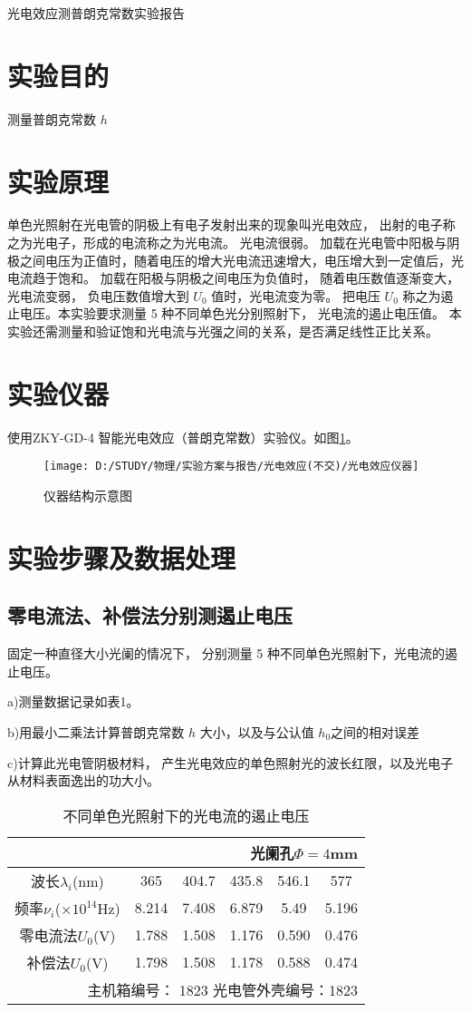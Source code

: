 \documentclass[11pt]{article}
\begin{document}
	\begin{center}
		\Large \heiti 光电效应测普朗克常数实验报告
	\end{center}
\section{实验目的}
测量普朗克常数 $ h $
\section{实验原理}
单色光照射在光电管的阴极上有电子发射出来的现象叫光电效应， 出射的电子称之为光电子，形成的电流称之为光电流。 光电流很弱。 加载在光电管中阳极与阴极之间电压为正值时，随着电压的增大光电流迅速增大，电压增大到一定值后，光电流趋于饱和。 加载在阳极与阴极之间电压为负值时， 随着电压数值逐渐变大，光电流变弱， 负电压数值增大到 $ U_0 $ 值时，光电流变为零。 把电压 $ U_0 $ 称之为遏止电压。本实验要求测量 5 种不同单色光分别照射下， 光电流的遏止电压值。 本实验还需测量和验证饱和光电流与光强之间的关系，是否满足线性正比关系。
\section{实验仪器}
使用ZKY-GD-4 智能光电效应（普朗克常数）实验仪。如图\ref{fig:1}。
\begin{figure}[htbp]
	\centering
	\texttt{[image: D:/STUDY/物理/实验方案与报告/光电效应(不交)/光电效应仪器]}
	\caption{仪器结构示意图}
	\label{fig:1}
\end{figure}
\section{实验步骤及数据处理}
\subsection{零电流法、补偿法分别测遏止电压}
固定一种直径大小光阑的情况下， 分别测量 5 种不同单色光照射下，光电流的遏止电压。

\kaishu a)测量数据记录如表1。

b)用最小二乘法计算普朗克常数 $ h $ 大小，以及与公认值 $ h_0 $之间的相对误差

c)计算此光电管阴极材料， 产生光电效应的单色照射光的波长红限，以及光电子从材料表面逸出的功大小。\songti
\begin{table}[htbp]\small
	\caption{不同单色光照射下的光电流的遏止电压}
	\centering
	\begin{tabular}{cccccc}
		\multicolumn{6}{r}{光阑孔$ \Phi=4  $mm}                       \\
		\toprule
		波长$ \lambda_i $(nm)   & 365   & 404.7 & 435.8 & 546.1 & 577   \\
		频率$ \nu _i $($ \times 10^{14} $Hz)   & 8.214 & 7.408 & 6.879 & 5.49  & 5.196 \\
		\midrule
		零电流法$ U_0 $(V) & 1.788 & 1.508 & 1.176 & 0.590 & 0.476 \\
		\midrule
		补偿法$ U_0 $(V)  & 1.798 & 1.508 & 1.178 & 0.588 & 0.474 \\
		\bottomrule
		\multicolumn{6}{r}{主机箱编号： 1823  光电管外壳编号：1823} \\
	\end{tabular}
\end{table}
\end{document}
